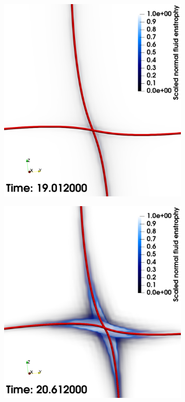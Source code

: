 \documentclass[%
 reprint,
 amsmath,amssymb,
 aps,
 prl,
]{revtex4-2}
\begin{document}
\begin{figure}
	\centering
    \begin{subfigure}[b]{0.24\textwidth}
		\centering
		\includegraphics*[width=\textwidth]{snap-1.pdf}
	\end{subfigure}
	\begin{subfigure}[b]{0.24\textwidth}
		\centering
		\includegraphics*[width=\textwidth]{snap-2.pdf}

\end{subfigure}
\end{figure}
\end{document}
